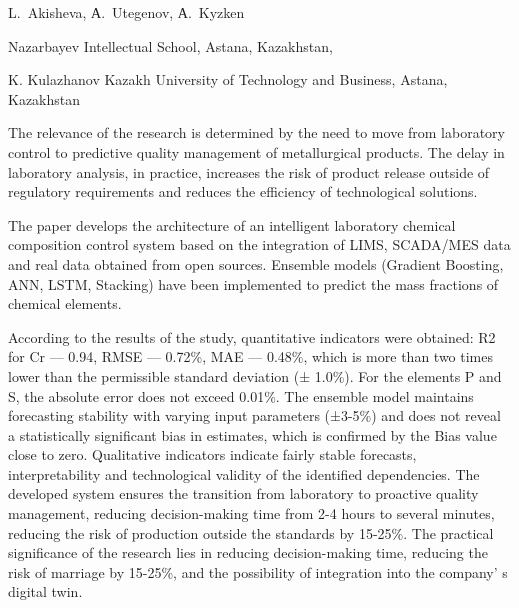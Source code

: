 
\begin{header}

L.~Akisheva\envelope,
А.~Utegenov,
А.~Kyzken
\end{header}

\begin{affil}
Nazarbayev Intellectual School, Astana, Kazakhstan,

K. Kulazhanov Kazakh University of Technology and Business, Astana, Kazakhstan

\end{affil}

The relevance of the research is determined by the need to move from
laboratory control to predictive quality management of metallurgical
products. The delay in laboratory analysis, in practice, increases the
risk of product release outside of regulatory requirements and reduces
the efficiency of technological solutions.

The paper develops the architecture of an intelligent laboratory
chemical composition control system based on the integration of LIMS,
SCADA/MES data and real data obtained from open sources. Ensemble models
(Gradient Boosting, ANN, LSTM, Stacking) have been implemented to
predict the mass fractions of chemical elements.

According to the results of the study, quantitative indicators were
obtained: R2 for Cr --- 0.94, RMSE --- 0.72\%, MAE --- 0.48\%, which is
more than two times lower than the permissible standard deviation (±
1.0\%). For the elements P and S, the absolute error does not exceed
0.01\%. The ensemble model maintains forecasting stability with varying
input parameters (±3-5\%) and does not reveal a statistically
significant bias in estimates, which is confirmed by the Bias value
close to zero. Qualitative indicators indicate fairly stable forecasts,
interpretability and technological validity of the identified
dependencies. The developed system ensures the transition from
laboratory to proactive quality management, reducing decision-making
time from 2-4 hours to several minutes, reducing the risk of production
outside the standards by 15-25\%. The practical significance of the
research lies in reducing decision-making time, reducing the risk of
marriage by 15-25\%, and the possibility of integration into the
company' s digital twin.

